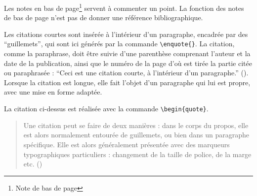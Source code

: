 Les notes en bas de page\footnote{Note de bas de page} servent à commenter un point. La fonction des notes de bas de page n'est pas de donner une référence bibliographique.

Les citations courtes sont insérée à l'intérieur d'un paragraphe, encadrée par des \enquote{guillemets}, qui sont ici générés par la commande \verb?\enquote{}?. La citation, comme la paraphrase, doit être suivie d'une parenthèse comprenant l'auteur et la date de la publication, ainsi que le numéro de la page d'où est tirée la partie citée ou paraphrasée : \enquote{Ceci est une citation courte, à l'intérieur d'un paragraphe.} (\cite[54]{bertholet_livres_1890}). Lorsque la citation est longue, elle fait l'objet d'un paragraphe qui lui est propre, avec une mise en forme adaptée.

La citation ci-dessus est réalisée avec la commande \verb?\begin{quote}?.

\begin{quote}
	Une citation peut se faire de deux manières : dans le corps du propos, elle est alors normalement entourée de guillemets, ou bien dans un paragraphe spécifique. Elle est alors	généralement présentée avec des marqueurs typographiques particuliers : changement de la taille de police, de la marge etc. (\cite[45]{rouquette_xelatex_2012})\end{quote}


